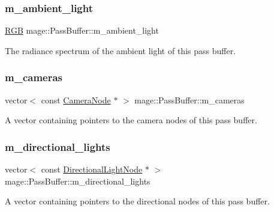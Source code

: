 \subsubsection{\texorpdfstring{m\+\_\+ambient\+\_\+light}{m\_ambient\_light}}
{\footnotesize\ttfamily \hyperlink{structmage_1_1_r_g_b}{R\+GB} mage\+::\+Pass\+Buffer\+::m\+\_\+ambient\+\_\+light\hspace{0.3cm}{\ttfamily [private]}}

The radiance spectrum of the ambient light of this pass buffer. \hypertarget{structmage_1_1_pass_buffer_a4885440342be6a2cd11002781704a63f}{}\label{structmage_1_1_pass_buffer_a4885440342be6a2cd11002781704a63f} 
\subsubsection{\texorpdfstring{m\+\_\+cameras}{m\_cameras}}
{\footnotesize\ttfamily vector$<$ const \hyperlink{classmage_1_1_camera_node}{Camera\+Node} $\ast$ $>$ mage\+::\+Pass\+Buffer\+::m\+\_\+cameras\hspace{0.3cm}{\ttfamily [private]}}

A vector containing pointers to the camera nodes of this pass buffer. \hypertarget{structmage_1_1_pass_buffer_a20f2a4518ea6121e6c9ae0ed9d263435}{}\label{structmage_1_1_pass_buffer_a20f2a4518ea6121e6c9ae0ed9d263435} 
\subsubsection{\texorpdfstring{m\+\_\+directional\+\_\+lights}{m\_directional\_lights}}
{\footnotesize\ttfamily vector$<$ const \hyperlink{namespacemage_a7637b5351fc0f66a10badd80ebb35899}{Directional\+Light\+Node} $\ast$ $>$ mage\+::\+Pass\+Buffer\+::m\+\_\+directional\+\_\+lights\hspace{0.3cm}{\ttfamily [private]}}

A vector containing pointers to the directional nodes of this pass buffer. \hypertarget{structmage_1_1_pass_buffer_a3691cc52fe3bc5f1c86bf0dad36061d8}{}\label{structmage_1_1_pass_buffer_a3691cc52fe3bc5f1c86bf0dad36061d8} 
